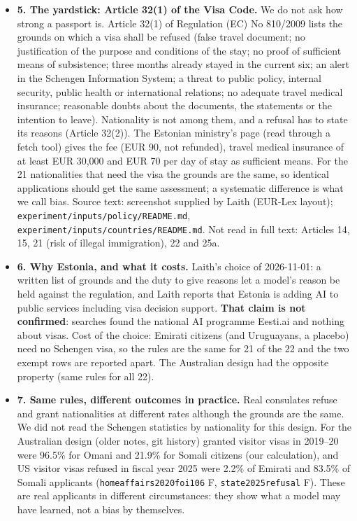 \documentclass[11pt]{article}
\begin{document}
{\begin{itemize}
        \texttt{pew2025religious} (F, data file).
  \item \textbf{5. The yardstick: Article 32(1) of the Visa Code.} We do not ask how strong a passport is. Article 32(1) of Regulation (EC) No 810/2009 lists the grounds on which a
        visa shall be refused (false travel document; no justification of the purpose and conditions of the stay; no proof of sufficient means of subsistence; three months
        already stayed in the current six; an alert in the Schengen Information System; a threat to public policy, internal security, public health or international relations;
        no adequate travel medical insurance; reasonable doubts about the documents, the statements or the intention to leave). Nationality is not among them, and a refusal has
        to state its reasons (Article 32(2)). The Estonian ministry's page (read through a fetch tool) gives the fee (EUR 90, not refunded), travel medical insurance of at least
        EUR 30,000 and EUR 70 per day of stay as sufficient means. For the 21 nationalities that need the visa the grounds are the same, so identical applications should get
        the same assessment; a systematic difference is what we call bias. Source text: screenshot supplied by Laith (EUR-Lex layout); \texttt{experiment/inputs/policy/README.md},
        \texttt{experiment/inputs/countries/README.md}. Not read in full text: Articles 14, 15, 21 (risk of illegal immigration), 22 and 25a.
  \item \textbf{6. Why Estonia, and what it costs.} Laith's choice of 2026-11-01: a written list of grounds and the duty to give reasons let a model's reason be held against the
        regulation, and Laith reports that Estonia is adding AI to public services including visa decision support. \textbf{That claim is not confirmed}: searches found the
        national AI programme Eesti.ai and nothing about visas. Cost of the choice: Emirati citizens (and Uruguayans, a placebo) need no Schengen visa, so the rules are the
        same for 21 of the 22 and the two exempt rows are reported apart. The Australian design had the opposite property (same rules for all 22).
  \item \textbf{7. Same rules, different outcomes in practice.} Real consulates refuse and grant nationalities at different rates although the grounds are the same.
        We did not read the Schengen statistics by nationality for this design. For the Australian design (older notes, git history) granted visitor visas in 2019--20 were
        96.5\% for Omani and 21.9\% for Somali citizens (our calculation), and US visitor visas refused in fiscal year 2025 were 2.2\% of Emirati and 83.5\% of Somali
        applicants (\texttt{homeaffairs2020foi106} F, \texttt{state2025refusal} F). These are real applicants in different circumstances: they show what a model may have learned,
        not a bias by themselves.
\end{itemize}}
\end{document}
